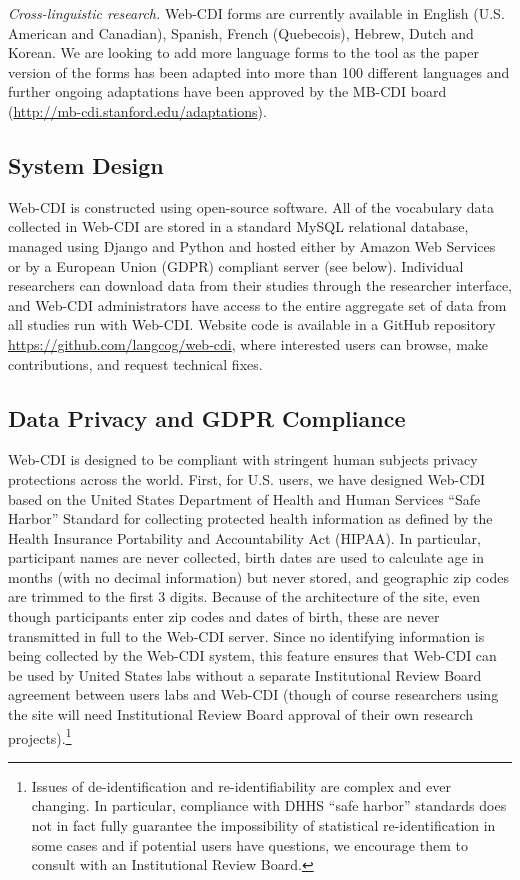 \documentclass[
  english,
  ,man,floatsintext]{apa6}
\begin{document}
\emph{Cross-linguistic research.} Web-CDI forms are currently available in English (U.S. American and Canadian), Spanish, French (Quebecois), Hebrew, Dutch and Korean. We are looking to add more language forms to the tool as the paper version of the forms has been adapted into more than 100 different languages and further ongoing adaptations have been approved by the MB-CDI board (\url{http://mb-cdi.stanford.edu/adaptations}).

\hypertarget{system-design}{%
\subsection{System Design}\label{system-design}}

Web-CDI is constructed using open-source software. All of the vocabulary data collected in Web-CDI are stored in a standard MySQL relational database, managed using Django and Python and hosted either by Amazon Web Services or by a European Union (GDPR) compliant server (see below). Individual researchers can download data from their studies through the researcher interface, and Web-CDI administrators have access to the entire aggregate set of data from all studies run with Web-CDI. Website code is available in a GitHub repository \url{https://github.com/langcog/web-cdi}, where interested users can browse, make contributions, and request technical fixes.

\hypertarget{data-privacy-and-gdpr-compliance}{%
\subsection{Data Privacy and GDPR Compliance}\label{data-privacy-and-gdpr-compliance}}

Web-CDI is designed to be compliant with stringent human subjects privacy protections across the world. First, for U.S. users, we have designed Web-CDI based on the United States Department of Health and Human Services \enquote{Safe Harbor} Standard for collecting protected health information as defined by the Health Insurance Portability and Accountability Act (HIPAA). In particular, participant names are never collected, birth dates are used to calculate age in months (with no decimal information) but never stored, and geographic zip codes are trimmed to the first 3 digits. Because of the architecture of the site, even though participants enter zip codes and dates of birth, these are never transmitted in full to the Web-CDI server. Since no identifying information is being collected by the Web-CDI system, this feature ensures that Web-CDI can be used by United States labs without a separate Institutional Review Board agreement between users labs and Web-CDI (though of course researchers using the site will need Institutional Review Board approval of their own research projects).\footnote{Issues of de-identification and re-identifiability are complex and ever changing. In particular, compliance with DHHS \enquote{safe harbor} standards does not in fact fully guarantee the impossibility of statistical re-identification in some cases and if potential users have questions, we encourage them to consult with an Institutional Review Board.}
\end{document}
